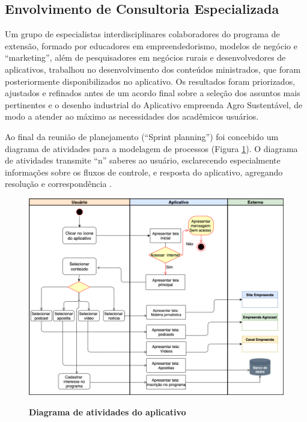 \subsection{Envolvimento de Consultoria Especializada}

Um grupo de especialistas interdisciplinares colaboradores do programa de extensão, formado por educadores em empreendedorismo, modelos de negócio e “marketing”, além de pesquisadores em negócios rurais e desenvolvedores de aplicativos, trabalhou no desenvolvimento dos conteúdos ministrados, que foram posteriormente disponibilizados no aplicativo. Os resultados foram priorizados, ajustados e refinados antes de um acordo final sobre a seleção dos assuntos mais pertinentes e o desenho industrial do Aplicativo empreenda Agro Sustentável, de modo a atender ao máximo as necessidades dos acadêmicos usuários.

Ao final da reunião de planejamento (“Sprint planning”) foi concebido um diagrama de atividades para a modelagem de processos (Figura \ref{figura_diagrama}). O diagrama de atividades transmite “n” saberes ao usuário, esclarecendo especialmente informações sobre os fluxos de controle, e resposta do aplicativo, agregando resolução e correspondência \cite{pressman_engenharia_2016}.

\begin{figure}[H]
\centering
\caption{\textbf{Diagrama de atividades do aplicativo}}
\includegraphics[scale=0.4]{Imagens/diagrama_aplicativo.png}
\label{figura_diagrama}
\end{figure}


